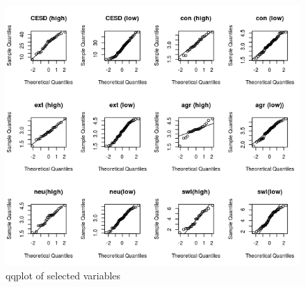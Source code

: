 \begin{figure}
  \includegraphics[scale=0.9]{CESD_distortion}
  \caption{qqplot of selected variables}
  \label{fig:three}
\end{figure}


